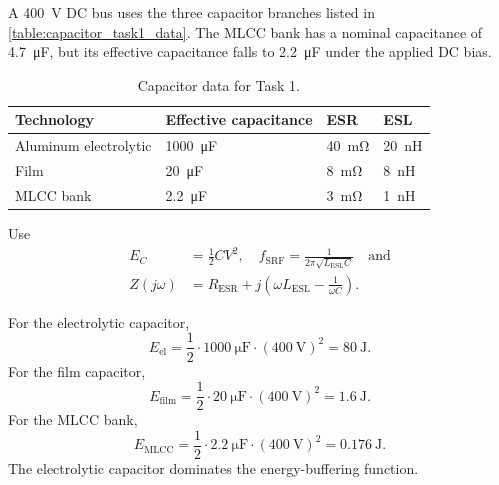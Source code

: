 


A \SI{400}{\volt} DC bus uses the three capacitor branches listed in
\autoref{table:capacitor_task1_data}. The MLCC bank has a nominal capacitance of
\SI{4.7}{\micro\farad}, but its effective capacitance falls to
\SI{2.2}{\micro\farad} under the applied DC bias.

\begin{table}[ht]
    \centering
    \begin{tabular}{llll}
        \toprule
        Technology & Effective capacitance & ESR & ESL \\
        \midrule
        Aluminum electrolytic & \SI{1000}{\micro\farad} & \SI{40}{\milli\ohm} & \SI{20}{\nano\henry} \\
        Film & \SI{20}{\micro\farad} & \SI{8}{\milli\ohm} & \SI{8}{\nano\henry} \\
        MLCC bank & \SI{2.2}{\micro\farad} & \SI{3}{\milli\ohm} & \SI{1}{\nano\henry} \\
        \bottomrule
    \end{tabular}
    \caption{Capacitor data for Task 1.}
    \label{table:capacitor_task1_data}
\end{table}

Use
\begin{align*}
    E_C &= \frac{1}{2}CV^2, \quad 
    f_\mathrm{SRF} = \frac{1}{2\pi\sqrt{L_\mathrm{ESL}C}} \quad  \text{and} \\
    Z(j\omega) &= R_\mathrm{ESR} + j\left(\omega L_\mathrm{ESL}-\frac{1}{\omega C}\right).
\end{align*}


\begin{solutionblock}
    For the electrolytic capacitor,
    \begin{equation}
        E_\mathrm{el}=\frac{1}{2}\cdot\SI{1000}{\micro\farad}\cdot(\SI{400}{\volt})^2
        =\SI{80}{\joule}.
    \end{equation}
    For the film capacitor,
    \begin{equation}
        E_\mathrm{film}=\frac{1}{2}\cdot\SI{20}{\micro\farad}\cdot(\SI{400}{\volt})^2
        =\SI{1.6}{\joule}.
    \end{equation}
    For the MLCC bank,
    \begin{equation}
        E_\mathrm{MLCC}=\frac{1}{2}\cdot\SI{2.2}{\micro\farad}\cdot(\SI{400}{\volt})^2
        =\SI{0.176}{\joule}.
    \end{equation}
    The electrolytic capacitor dominates the energy-buffering function.
\end{solutionblock}

